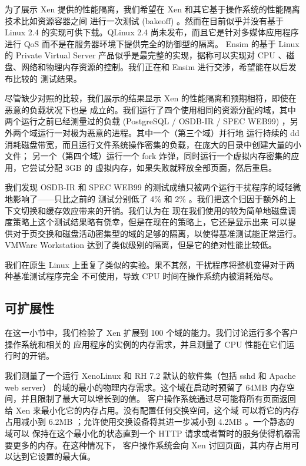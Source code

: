 为了展示 Xen 提供的性能隔离，我们希望在 Xen 和其它基于操作系统的性能隔离技术比如资源容器之间
进行一次测试 (bakeoff) 。然而在目前似乎并没有基于 Linux 2.4 的实现可供下载。QLinux 2.4
尚未发布，而且它是针对多媒体应用程序进行 QoS 而不是在服务器环境下提供完全的防御型的隔离。
Ensim 的基于 Linux 的 Private Virtual Server 产品似乎是最完整的实现，据称可以实现对
CPU 、磁盘、网络和物理内存资源的控制。我们正在和 Ensim 进行交涉，希望能在以后发布比较的
测试结果。

尽管缺少对照的比较，我们展示的结果显示 Xen 的性能隔离和预期相符，即使在恶意的负载状况下也是
成立的。我们运行了四个使用相同的资源分配的域，其中两个运行之前已经测量过的负载 (PostgreSQL
/ OSDB-IR / SPEC WEB99) ，另外两个域运行一对极为恶意的进程。其中一个（第三个域）并行地
运行持续的 dd 消耗磁盘带宽，而且运行文件系统操作密集的负载，在庞大的目录中创建大量的小文件；
另一个（第四个域）运行一个 fork 炸弹，同时运行一个虚拟内存密集的应用，它尝试分配 3GB 的
虚拟内存，如果失败就释放全部页面，然后重启。

我们发现 OSDB-IR 和 SPEC WEB99 的测试成绩只被两个运行干扰程序的域轻微地影响了——只比之前的
测试分别低了 4\% 和 2\% 。我们把这个归因于额外的上下文切换和缓存效应带来的开销。我们认为在
现在我们使用的较为简单地磁盘调度策略上这个测试结果略有侥幸，但是在现在的策略上，它还是显示出来
可以提供对于页交换和磁盘活动密集型的域的足够的隔离，以使得基准测试能正常运行。
VMWare Workstation 达到了类似级别的隔离，但是它的绝对性能比较低。

我们在原生 Linux 上重复了类似的实验。果不其然，干扰程序将整机变得对于两种基准测试程序完全
不可使用，导致 CPU 时间在操作系统内被消耗殆尽。

\subsection{可扩展性}

在这一小节中，我们检验了 Xen 扩展到 100 个域的能力。我们讨论运行多个客户操作系统和相关的
应用程序的实例的内存需求，并且测量了 CPU 性能在它们运行时的开销。

我们测量了一个运行 XenoLinux 和 RH 7.2 默认的软件集（包括 sshd 和 Apache web server）
的域的最小的物理内存需求。这个域在启动时预留了 64MB 内存空间，并且限制了最大可以增长到的值。
客户操作系统通过尽可能将所有页面返回给 Xen 来最小化它的内存占用。没有配置任何交换空间，这个域
可以将它的内存占用减小到 6.2MB ；允许使用交换设备将其进一步减小到 4.2MB 。一个静态的域可以
保持在这个最小化的状态直到一个 HTTP 请求或者暂时的服务使得机器需要更多的内存。在这种情况下，
客户操作系统会向 Xen 讨回页面，其内存占用可以达到它设置的最大值。


